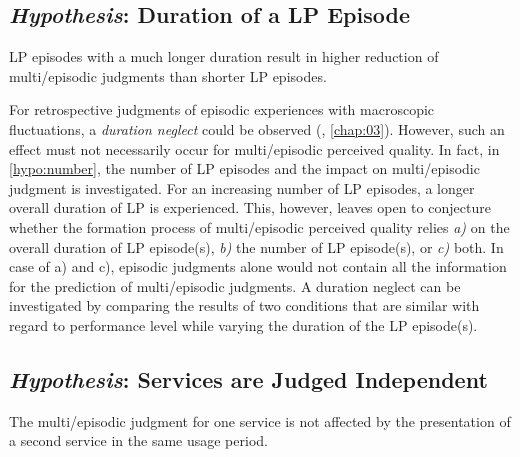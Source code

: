 \subsection[H6: Duration of a \acs{LP} Episode]{\emph{Hypothesis}: Duration of a \acs{LP} Episode}
\begin{hypothesis}\label{hypo:duration}
\ac{LP} episodes with a much longer duration result in higher reduction of multi\-/episodic judgments than shorter \ac{LP} episodes.
\end{hypothesis}

For retrospective judgments of episodic experiences with macroscopic fluctuations, a \emph{duration neglect} could be observed (\cf, \autoref{chap:03}).
However, such an effect must not necessarily occur for multi\-/episodic perceived quality.
In fact, in \autoref{hypo:number}, the number of \ac{LP} episodes and the impact on multi\-/episodic judgment is investigated.
For an increasing number of \ac{LP} episodes, a longer overall duration of \ac{LP} is experienced.
This, however, leaves open to conjecture whether the formation process of multi\-/episodic perceived quality relies \emph{a)} on the overall duration of \ac{LP} episode(s), \emph{b)} the number of \ac{LP} episode(s), or \emph{c)} both.
In case of a) and c), episodic judgments alone would not contain all the information for the prediction of multi\-/episodic judgments.
A duration neglect can be investigated by comparing the results of two conditions that are similar with regard to performance level while varying the duration of the \ac{LP} episode(s).

\subsection[H7: Services are Judged Independent]{\emph{Hypothesis}: Services are Judged Independent}
\begin{hypothesis}\label{hypo:independent}
The multi\-/episodic judgment for one service is not affected by the presentation of a second service in the same usage period.
\end{hypothesis}

